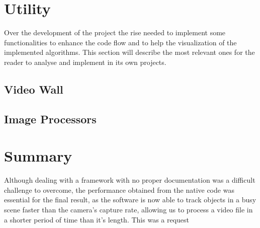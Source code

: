 \section{Utility}

Over the development of the project the rise needed to implement some functionalities to enhance the code flow and to help the visualization of the implemented algorithms. This section will describe the most relevant ones for the reader to analyse and implement in its own projects.

\subsection{Video Wall}

\subsection{Image Processors}

\section{Summary}

Although dealing with a framework with no proper documentation was a difficult challenge to overcome, the performance obtained from the native code was essential for the final result, as the software is now able to track objects in a busy scene faster than the camera's capture rate, allowing us to process a video file in a shorter period of time than it's length. This was a request 